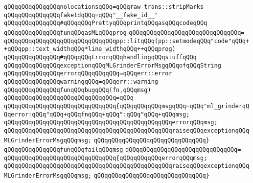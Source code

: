 \newline
\verb|qQQqqQQqqQQqqQQqnolocationsqQQq=qQQqraw_trans::stripMarks|\newline
\newline
\verb|qQQqqQQqqQQqqQQqfakeIdqQQq=qQQq"__fake_id__"|\newline
\newline
\verb|qQQqqQQqqQQqqQQq#qQQqqQQqPrettyqQQqprintqQQqasqQQqcodeqQQq|\newline
\verb|qQQqqQQqqQQqqQQqfunqQQqasMLqQQqprog|\newline
\verb|qQQqqQQqqQQqqQQqqQQqqQQqqQQqqQQq=|\newline
\verb|qQQqqQQqqQQqqQQqqQQqqQQqqQQqqQQqpp::litqQQq(pp::setmodeqQQq"code"qQQq++qQQqpp::text_widthqQQq*line_widthqQQq++qQQqprog)|\newline
\newline
\verb|qQQqqQQqqQQqqQQq#qQQqqQQqErrorqQQqhandlingqQQqstuffqQQq|\newline
\verb|qQQqqQQqqQQqqQQqexceptionqQQqMLGrinderErrorMsgqQQqofqQQqString|\newline
\verb|qQQqqQQqqQQqqQQqerrorqQQqqQQqqQQq=qQQqerr::error|\newline
\verb|qQQqqQQqqQQqqQQqwarningqQQq=qQQqerr::warning|\newline
\newline
\verb|qQQqqQQqqQQqqQQqfunqQQqbugqQQq(fn,qQQqmsg)|\newline
\verb|qQQqqQQqqQQqqQQqqQQqqQQqqQQqqQQq=qQQq|\newline
\verb|qQQqqQQqqQQqqQQqqQQqqQQqqQQqqQQq{qQQqqQQqqQQqmsgqQQq=qQQq"ml_grinderqQQqerror:qQQq"qQQq+qQQqfnqQQq+qQQq":qQQq"qQQq+qQQqmsg;|\newline
\verb|qQQqqQQqqQQqqQQqqQQqqQQqqQQqqQQqqQQqqQQqqQQqqQQqerrorqQQqmsg;|\newline
\verb|qQQqqQQqqQQqqQQqqQQqqQQqqQQqqQQqqQQqqQQqqQQqqQQqraiseqQQqexceptionqQQqMLGrinderErrorMsgqQQqmsg;|\newline
\verb|qQQqqQQqqQQqqQQqqQQqqQQqqQQqqQQq}|\newline
\newline
\verb|qQQqqQQqqQQqqQQqfunqQQqfailqQQqmsg|\newline
\verb|qQQqqQQqqQQqqQQqqQQqqQQqqQQqqQQq=|\newline
\verb|qQQqqQQqqQQqqQQqqQQqqQQqqQQqqQQq{qQQqqQQqqQQqerrorqQQqmsg;|\newline
\verb|qQQqqQQqqQQqqQQqqQQqqQQqqQQqqQQqqQQqqQQqqQQqqQQqraiseqQQqexceptionqQQqMLGrinderErrorMsgqQQqmsg;|\newline
\verb|qQQqqQQqqQQqqQQqqQQqqQQqqQQqqQQq}|\newline
